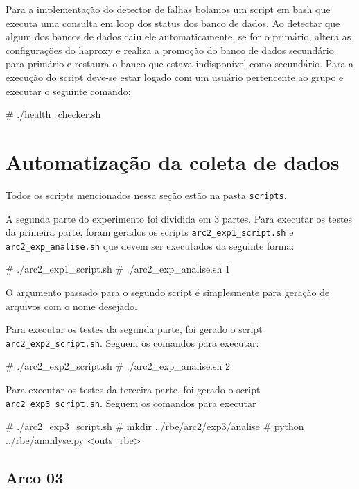 \documentclass[a4paper,10pt]{article}
\begin{document}
	Para a implementação do detector de falhas bolamos um script em bash que executa uma consulta em loop dos status dos banco de dados. Ao detectar que algum dos bancos de dados caiu ele automaticamente, se for o primário, altera as configurações do haproxy e realiza a promoção do banco de dados secundário para primário e restaura o banco que estava indisponível como secundário. Para a execução do script deve-se estar logado com um usuário pertencente ao grupo e executar o seguinte comando:

       \begin{spverbatim}
# ./health_checker.sh
        \end{spverbatim}

\section{Automatização da coleta de dados}

            Todos os scripts mencionados nessa seção estão na pasta \verb|scripts|.

	A segunda parte do experimento foi dividida em 3 partes. Para executar os testes da primeira parte, foram gerados os scripts \verb|arc2_exp1_script.sh| e \verb|arc2_exp_analise.sh| que devem ser executados da seguinte forma:

 	\begin{spverbatim}
	# ./arc2_exp1_script.sh
	# ./arc2_exp_analise.sh 1
	\end{spverbatim}
\noindent
\newline
O argumento passado para o segundo script é simplesmente para geração de arquivos com o nome desejado.
\newline

Para executar os testes da segunda parte, foi gerado o script \verb|arc2_exp2_script.sh|. Seguem os comandos para executar:
	\begin{spverbatim}
	# ./arc2_exp2_script.sh
	# ./arc2_exp_analise.sh 2
	\end{spverbatim}
\noindent
\newline
Para executar os testes da terceira parte, foi gerado o script \verb|arc2_exp3_script.sh|. Seguem os comandos para executar
	\begin{spverbatim}
	# ./arc2_exp3_script.sh
	# mkdir ../rbe/arc2/exp3/analise
	# python ../rbe/ananlyse.py <outs_rbe>
	\end{spverbatim}

    \subsection{Arco 03}
\end{document}
